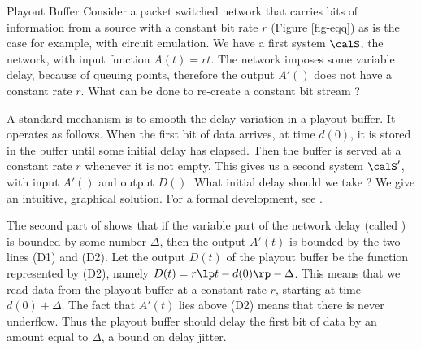 \begin{ex}{Playout Buffer} Consider a packet switched
network that carries bits of information from a source with a
constant bit rate $r$ (Figure \ref{fig-eqq}) as is the case for
example, with circuit emulation. We have a first system $\calS$, the
network, with input function $A(t)=rt$. The network imposes some
variable delay, because of queuing points, therefore the output
$A'()$ does not have a constant rate $r$. What can be done to
re-create a constant bit stream ?
\begin{figure}[!htbp]
\end{figure}
A standard mechanism is to smooth the delay
variation in a playout buffer. It operates as
follows. When the first bit of data arrives, at
time $d(0)$, it is stored in the buffer until
some initial delay has elapsed. Then the buffer
is served at a constant rate $r$ whenever it is
not empty. This gives us a second system
$\calS'$, with input $A'()$ and output $D()$.
What initial delay should we take ? We give an
intuitive, graphical solution. For a formal
development, see \cite[Section 1.1.1]{lt01}.

The second part of  shows that if the variable
part of the network delay (called ) is bounded
by some number $\Delta$, then the output $A'(t)$ is bounded by
the two lines (D1) and (D2). Let the output $D(t)$ of the
playout buffer be the function represented by (D2), namely
$D(t)=r \lp  t -d(0)\rp - \Delta$. This means that we read data from the
playout buffer at a constant rate $r$, starting at time $d(0)+
\Delta$. The fact that $A'(t)$ lies above (D2) means that there
is never underflow. Thus the playout buffer should delay the
first bit of data by an amount equal to $\Delta$, a bound on
delay jitter.

\end{ex}

